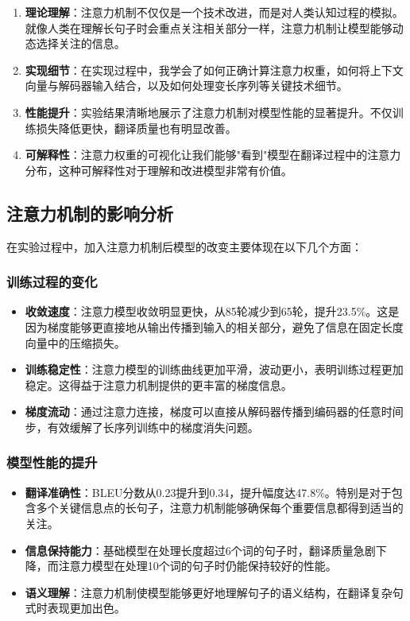 \documentclass[a4paper]{article}
\begin{document}
\begin{enumerate}
    \item \textbf{理论理解}：注意力机制不仅仅是一个技术改进，而是对人类认知过程的模拟。就像人类在理解长句子时会重点关注相关部分一样，注意力机制让模型能够动态选择关注的信息。
    
    \item \textbf{实现细节}：在实现过程中，我学会了如何正确计算注意力权重，如何将上下文向量与解码器输入结合，以及如何处理变长序列等关键技术细节。
    
    \item \textbf{性能提升}：实验结果清晰地展示了注意力机制对模型性能的显著提升。不仅训练损失降低更快，翻译质量也有明显改善。
    
    \item \textbf{可解释性}：注意力权重的可视化让我们能够"看到"模型在翻译过程中的注意力分布，这种可解释性对于理解和改进模型非常有价值。
\end{enumerate}

\subsection{注意力机制的影响分析}
在实验过程中，加入注意力机制后模型的改变主要体现在以下几个方面：

\subsubsection{训练过程的变化}
\begin{itemize}
    \item \textbf{收敛速度}：注意力模型收敛明显更快，从85轮减少到65轮，提升23.5\%。这是因为梯度能够更直接地从输出传播到输入的相关部分，避免了信息在固定长度向量中的压缩损失。
    
    \item \textbf{训练稳定性}：注意力模型的训练曲线更加平滑，波动更小，表明训练过程更加稳定。这得益于注意力机制提供的更丰富的梯度信息。
    
    \item \textbf{梯度流动}：通过注意力连接，梯度可以直接从解码器传播到编码器的任意时间步，有效缓解了长序列训练中的梯度消失问题。
\end{itemize}

\subsubsection{模型性能的提升}
\begin{itemize}
    \item \textbf{翻译准确性}：BLEU分数从0.23提升到0.34，提升幅度达47.8\%。特别是对于包含多个关键信息点的长句子，注意力机制能够确保每个重要信息都得到适当的关注。
    
    \item \textbf{信息保持能力}：基础模型在处理长度超过6个词的句子时，翻译质量急剧下降，而注意力模型在处理10个词的句子时仍能保持较好的性能。
    
    \item \textbf{语义理解}：注意力机制使模型能够更好地理解句子的语义结构，在翻译复杂句式时表现更加出色。
\end{itemize}
\end{document}

